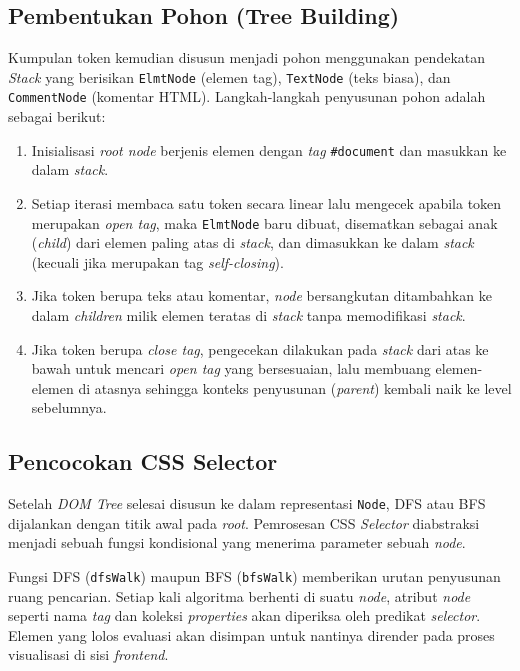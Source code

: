 \subsection{Pembentukan Pohon (Tree Building)}
Kumpulan token kemudian disusun menjadi pohon menggunakan pendekatan \textit{Stack} yang berisikan \texttt{ElmtNode} (elemen tag), \texttt{TextNode} (teks biasa), dan \texttt{CommentNode} (komentar HTML).
Langkah-langkah penyusunan pohon adalah sebagai berikut:
\begin{enumerate}
    \item Inisialisasi \textit{root node} berjenis elemen dengan \textit{tag} \texttt{\#document} dan masukkan ke dalam \textit{stack}.
    \item Setiap iterasi membaca satu token secara linear lalu mengecek apabila token merupakan \textit{open tag}, maka \texttt{ElmtNode} baru dibuat, disematkan sebagai anak (\textit{child}) dari elemen paling atas di \textit{stack}, dan dimasukkan ke dalam \textit{stack} (kecuali jika merupakan tag \textit{self-closing}).
    \item Jika token berupa teks atau komentar, \textit{node} bersangkutan ditambahkan ke dalam \textit{children} milik elemen teratas di \textit{stack} tanpa memodifikasi \textit{stack}.
    \item Jika token berupa \textit{close tag}, pengecekan dilakukan pada \textit{stack} dari atas ke bawah untuk mencari \textit{open tag} yang bersesuaian, lalu membuang elemen-elemen di atasnya sehingga konteks penyusunan (\textit{parent}) kembali naik ke level sebelumnya.
\end{enumerate}

\subsection{Pencocokan CSS Selector}
Setelah \textit{DOM Tree} selesai disusun ke dalam representasi \texttt{Node}, DFS atau BFS dijalankan dengan titik awal pada \textit{root}. Pemrosesan CSS \textit{Selector} diabstraksi menjadi sebuah fungsi kondisional yang menerima parameter sebuah \textit{node}. 

Fungsi DFS (\texttt{dfsWalk}) maupun BFS (\texttt{bfsWalk}) memberikan urutan penyusunan ruang pencarian. Setiap kali algoritma berhenti di suatu \textit{node}, atribut \textit{node} seperti nama \textit{tag} dan koleksi \textit{properties} akan diperiksa oleh predikat \textit{selector}. Elemen yang lolos evaluasi akan disimpan untuk nantinya dirender pada proses visualisasi di sisi \textit{frontend}.